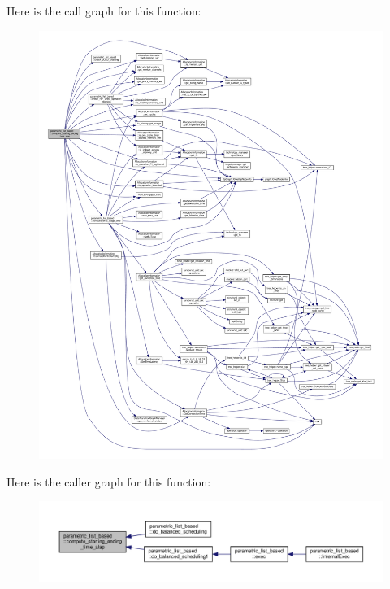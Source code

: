 Here is the call graph for this function\+:
\nopagebreak
\begin{figure}[H]
\begin{center}
\leavevmode
\includegraphics[width=350pt]{d7/d47/classparametric__list__based_aea554a314bf6dd38be5cc93a617cea30_cgraph}
\end{center}
\end{figure}
Here is the caller graph for this function\+:
\nopagebreak
\begin{figure}[H]
\begin{center}
\leavevmode
\includegraphics[width=350pt]{d7/d47/classparametric__list__based_aea554a314bf6dd38be5cc93a617cea30_icgraph}
\end{center}
\end{figure}
\mbox{\label{classparametric__list__based_a02e229e9aa133401c91ddf50fdd78604}} 
